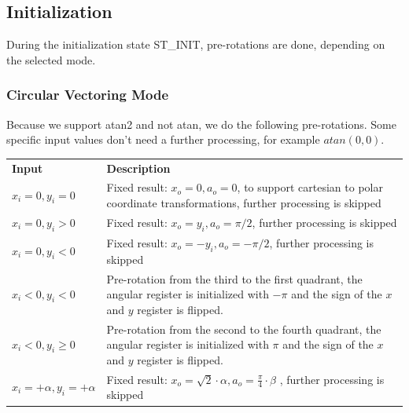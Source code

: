 \documentclass[a4paper, 12pt, notitlepage]{report}
\begin{document}
   \subsection{Initialization}
   During the initialization state ST\_INIT, pre-rotations are done, depending on 
   the selected mode.


      \subsubsection{Circular Vectoring Mode}
      Because we support atan2 and not atan, we do the following pre-rotations. 
      Some specific input values don't need a further processing, for 
      example $atan( 0, 0 )$.\newline\newline
         \begin{tabular}{@{}lp{380pt}@{}}
            \rowcolor{tableheadcolor}\textbf{Input} &\textbf{ Description }  \\

            $x_i = 0, y_i = 0$    &    Fixed result: $x_o =  0, a_o = 0$,   
            to support cartesian to polar coordinate transformations, 
            further processing is skipped  \\ \midrule

            $x_i = 0, y_i > 0 $   &    Fixed result: $x_o =  y_i, a_o = \pi/2$,  
            further processing is skipped \\ \midrule

            $x_i = 0, y_i < 0 $   &    Fixed result: $x_o = -y_i, a_o = -\pi/2$,  
            further processing is skipped \\ \midrule


            $x_i < 0, y_i < 0 $   &    Pre-rotation from the third to the first quadrant,
                                       the angular register is initialized with $-\pi$ and
                                       the sign of the $x$ and $y$ register is flipped. \\ \midrule

            $x_i < 0, y_i \ge 0 $   &    Pre-rotation from the second to the fourth quadrant,
                                       the angular register is initialized with $\pi$ and
                                       the sign of the $x$ and $y$ register is flipped. \\ \midrule


            $x_i = + \alpha, y_i = + \alpha $   &  Fixed result: $x_o = \sqrt{2} \cdot \alpha, a_o = \frac{\pi}{4} \cdot \beta$ ,
            further processing is skipped \\ \midrule


\end{tabular}
\end{document}

